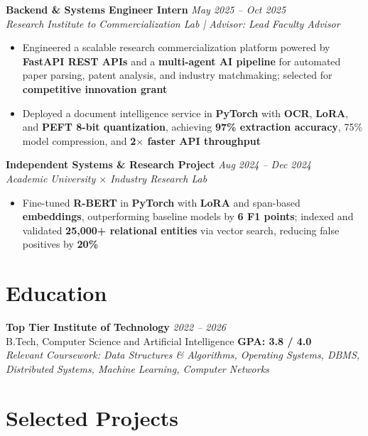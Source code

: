 \documentclass[10pt]{article}
\begin{document}
\textbf{Backend \& Systems Engineer Intern} \hfill \textcolor{subheadingcolor}{\textit{May 2025 -- Oct 2025}} \\
\textit{Research Institute to Commercialization Lab | Advisor: Lead Faculty Advisor}
\begin{itemize}
    \item Engineered a scalable research commercialization platform powered by \textbf{FastAPI REST APIs} and a \textbf{multi-agent AI pipeline} for automated paper parsing, patent analysis, and industry matchmaking; selected for \textbf{competitive innovation grant}
    \item Deployed a document intelligence service in \textbf{PyTorch} with \textbf{OCR}, \textbf{LoRA}, and \textbf{PEFT 8-bit quantization}, achieving \textbf{97\% extraction accuracy}, 75\% model compression, and \textbf{2$\times$ faster API throughput}
\end{itemize}
\vspace{-0.3em}

\textbf{Independent Systems \& Research Project} \hfill \textcolor{subheadingcolor}{\textit{Aug 2024 -- Dec 2024}} \\
\textit{Academic University $\times$ Industry Research Lab}
\begin{itemize}
    \item Fine-tuned \textbf{R-BERT} in \textbf{PyTorch} with \textbf{LoRA} and span-based \textbf{embeddings}, outperforming baseline models by \textbf{6 F1 points}; indexed and validated \textbf{25,000+ relational entities} via vector search, reducing false positives by \textbf{20\%}
\end{itemize}
\vspace{-0.45em}

\section*{Education}
\textbf{Top Tier Institute of Technology} \hfill \textit{2022 -- 2026} \\
B.Tech, Computer Science and Artificial Intelligence \hfill \textbf{GPA: 3.8 / 4.0} \\[0.05em]
{\small \textit{Relevant Coursework: Data Structures \& Algorithms, Operating Systems, DBMS, Distributed Systems, Machine Learning, Computer Networks}}
\vspace{-0.35em}

\section*{Selected Projects}
\end{document}

